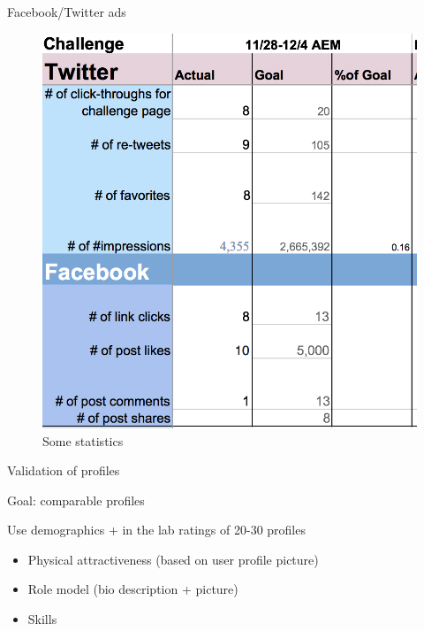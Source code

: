 \begin{frame}{Facebook/Twitter ads}

\begin{figure}
\centering
\includegraphics{ads.png}
\caption{Some statistics}
\end{figure}

\end{frame}

\begin{frame}{Validation of profiles}

Goal: comparable profiles

Use demographics + in the lab ratings of 20-30 profiles

\begin{itemize}
\tightlist
\item
  Physical attractiveness (based on user profile picture)
\item
  Role model (bio description + picture)
\item
  Skills
\end{itemize}

\end{frame}


